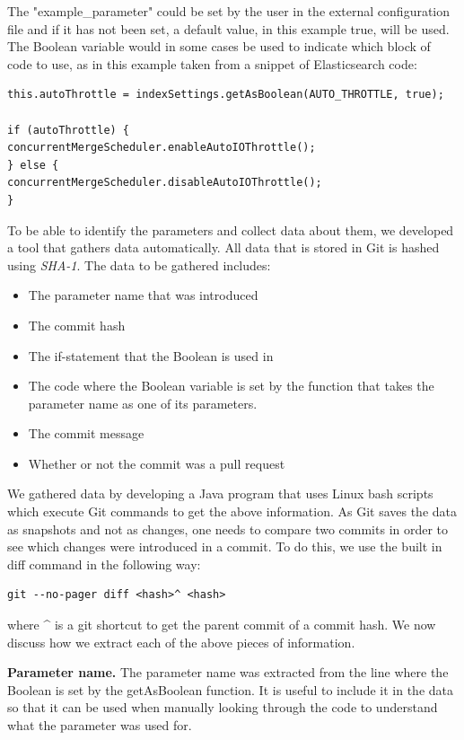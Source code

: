 The "example\_parameter" could be set by the user in the external configuration file and if it has not been set, a default value, in this example true, will be used. The Boolean variable would in some cases be used to indicate which block of code to use, as in this example taken from a snippet of Elasticsearch code:\\
\lstset{language=Java,numbers=left,xleftmargin=2em,frame=single,framexleftmargin=1.5em}
\begin{lstlisting}[frame=single,breaklines=true,tabsize=2]
this.autoThrottle = indexSettings.getAsBoolean(AUTO_THROTTLE, true);

if (autoThrottle) {
concurrentMergeScheduler.enableAutoIOThrottle();
} else {
concurrentMergeScheduler.disableAutoIOThrottle();
}
\end{lstlisting}

To be able to identify the parameters and collect data about them, we developed a tool that gathers data automatically. All data that is stored in Git is hashed using \textit{SHA-1}. The data to be gathered includes:
\begin{itemize}
\item The parameter name that was introduced
\item The commit hash
\item The if-statement that the Boolean is used in
\item The code where the Boolean variable is set by the function that takes the parameter name as one of its parameters.
\item The commit message
\item Whether or not the commit was a pull request
\end{itemize}
We gathered data by developing a Java program that uses Linux bash scripts which execute Git commands to get the above information. As Git saves the data as snapshots and not as changes, one needs to compare two commits in order to see which changes were introduced in a commit. To do this, we use the built in diff command in the following way: %
\lstset{language=Bash,numbers=left,xleftmargin=2em,frame=single,framexleftmargin=1.5em}
\begin{lstlisting}[frame=single,breaklines=true,tabsize=2]
git --no-pager diff <hash>^ <hash>
\end{lstlisting}
where \^{} is a git shortcut to get the parent commit of a commit hash. We now discuss how we extract each of the above pieces of information.

\textbf{Parameter name.} The parameter name was extracted from the line where the Boolean is set by the getAsBoolean function. It is useful to include it in the data so that it can be used when manually looking through the code to understand what the parameter was used for.

